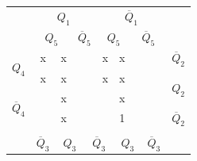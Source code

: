 \documentclass[a4paper,14pt]{article}
\begin{document}
\begin{table}[H]
	\begin{minipage}{.5\linewidth}
		\centering
\begin{tabular}{cccccccccc}
	& \multicolumn{4}{c}{$Q_1$}                                                                       & \multicolumn{4}{c}{$\overline{Q}_1$}                                                            &                        \\
	& \multicolumn{2}{c}{$Q_5$}                       & \multicolumn{2}{c}{$\overline{Q}_5$}          & \multicolumn{2}{c}{$Q_5$}                       & \multicolumn{2}{c}{$\overline{Q}_5$}          &                        \\ \cline{2-9}
	\multicolumn{1}{c|}{\multirow{2}{*}{$Q_4$}}            & \multicolumn{1}{c|}{x} & \multicolumn{1}{c|}{x} & \multicolumn{1}{c|}{} & \multicolumn{1}{c|}{} & \multicolumn{1}{c|}{x} & \multicolumn{1}{c|}{x} & \multicolumn{1}{c|}{} & \multicolumn{1}{c|}{} & $\overline{Q}_2$       \\ \cline{2-9}
	\multicolumn{1}{c|}{}                                  & \multicolumn{1}{c|}{x} & \multicolumn{1}{c|}{x} & \multicolumn{1}{c|}{} & \multicolumn{1}{c|}{} & \multicolumn{1}{c|}{x} & \multicolumn{1}{c|}{x} & \multicolumn{1}{c|}{} & \multicolumn{1}{c|}{} & \multirow{2}{*}{$Q_2$} \\ \cline{2-9}
	\multicolumn{1}{c|}{\multirow{2}{*}{$\overline{Q}_4$}} & \multicolumn{1}{c|}{}  & \multicolumn{1}{c|}{x} & \multicolumn{1}{c|}{} & \multicolumn{1}{c|}{} & \multicolumn{1}{c|}{}  & \multicolumn{1}{c|}{x} & \multicolumn{1}{c|}{} & \multicolumn{1}{c|}{} &                        \\ \cline{2-9}
	\multicolumn{1}{c|}{}                                  & \multicolumn{1}{c|}{}  & \multicolumn{1}{c|}{x} & \multicolumn{1}{c|}{} & \multicolumn{1}{c|}{} & \multicolumn{1}{c|}{}  & \multicolumn{1}{c|}{1} & \multicolumn{1}{c|}{} & \multicolumn{1}{c|}{} & $\overline{Q}_2$       \\ \cline{2-9}
	&                        & \multicolumn{2}{c}{}                           & \multicolumn{2}{c}{}                           & \multicolumn{2}{c}{}                           &                       &                        \\
	& $\overline{Q}_3$       & \multicolumn{2}{c}{$Q_3$}                      & \multicolumn{2}{c}{$\overline{Q}_3$}           & \multicolumn{2}{c}{$Q_3$}                      & $\overline{Q}_3$      &                       

\end{tabular}
\end{minipage}
\end{table}
\end{document}
